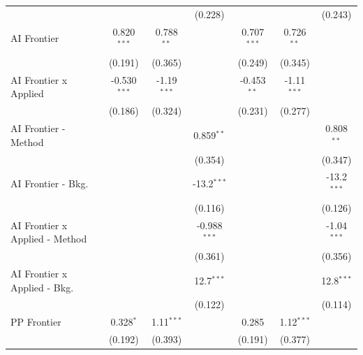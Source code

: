 \begin{tabular}{lcccccc}
                                  &                &                & (0.228)        &                &                & (0.243)\\   
   AI Frontier                    & 0.820$^{***}$  & 0.788$^{**}$   &                & 0.707$^{***}$  & 0.726$^{**}$   &   \\   
                                  & (0.191)        & (0.365)        &                & (0.249)        & (0.345)        &   \\   
   AI Frontier x Applied          & -0.530$^{***}$ & -1.19$^{***}$  &                & -0.453$^{**}$  & -1.11$^{***}$  &   \\   
                                  & (0.186)        & (0.324)        &                & (0.231)        & (0.277)        &   \\   
   AI Frontier - Method           &                &                & 0.859$^{**}$   &                &                & 0.808$^{**}$\\   
                                  &                &                & (0.354)        &                &                & (0.347)\\   
   AI Frontier - Bkg.             &                &                & -13.2$^{***}$  &                &                & -13.2$^{***}$\\   
                                  &                &                & (0.116)        &                &                & (0.126)\\   
   AI Frontier x Applied - Method &                &                & -0.988$^{***}$ &                &                & -1.04$^{***}$\\   
                                  &                &                & (0.361)        &                &                & (0.356)\\   
   AI Frontier x Applied - Bkg.   &                &                & 12.7$^{***}$   &                &                & 12.8$^{***}$\\   
                                  &                &                & (0.122)        &                &                & (0.114)\\   
   PP Frontier                    & 0.328$^{*}$    & 1.11$^{***}$   &                & 0.285          & 1.12$^{***}$   &   \\   
                                  & (0.192)        & (0.393)        &                & (0.191)        & (0.377)        &   \\   

\end{tabular}
